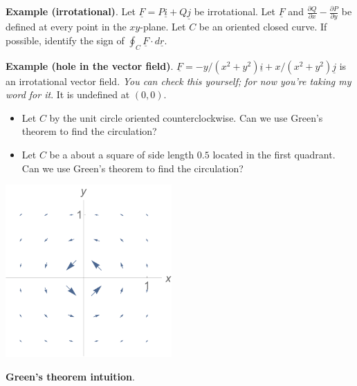 \documentclass[12pt,letterpaper,noanswers]{exam}
\newcommand{\mb}[1]{\underline{#1}}
\begin{document}
\noindent\textbf{Example (irrotational)}. Let $\mb F =P\mb i + Q\mb j$ be irrotational.
Let $\mb F$ and $\displaystyle\frac{\partial Q}{\partial x} - \frac{\partial P}{\partial y}$ be defined at every point in the $xy$-plane.  Let $C$ be an oriented closed curve.  If possible, identify the sign of $\displaystyle\oint_C \mb F\cdot d\mb r$.


\vspace{1in}




\eject

\noindent\textbf{Example (hole in the vector field)}. $\mb F = -y/(x^2+y^2)\mb i + x/(x^2+y^2)\mb j$ is an irrotational vector field. \emph{You can check this yourself; for now you're taking my word for it}.  It is undefined at $(0,0)$. %
\begin{itemize}
\itemsep0em
    \item Let $C$ by the unit circle oriented counterclockwise.  Can we use Green's theorem to find the circulation?
    \item Let $C$ be a about a square of side length $0.5$ located in the first quadrant.  Can we use Green's theorem to find the circulation?
\end{itemize}


\includegraphics[width=2.5in]{img/C28p6.pdf}





\noindent\textbf{Green's theorem intuition}.
\end{document}
